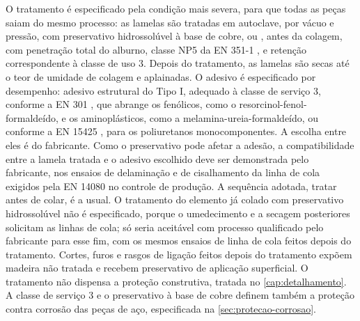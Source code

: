 O tratamento é especificado pela condição mais severa, para que todas as peças
saiam do mesmo processo: as lamelas são tratadas em autoclave, por vácuo e
pressão, com preservativo hidrossolúvel à base de cobre,  ou
, antes da
colagem, com penetração total do alburno, classe NP5 da EN 351-1
\cite{EN351-1:2007}, e retenção correspondente à classe de uso 3. Depois do
tratamento, as lamelas são secas até o teor de umidade de colagem e
aplainadas. O adesivo é especificado por desempenho: adesivo estrutural do
Tipo I, adequado à classe de serviço 3, conforme a EN 301 \cite{EN301:2017}, que
abrange os fenólicos, como o resorcinol-fenol-formaldeído, e os aminoplásticos,
como a melamina-ureia-formaldeído, ou conforme a EN 15425 \cite{EN15425:2017},
para os poliuretanos monocomponentes. A escolha entre eles é do fabricante. Como
o preservativo pode afetar a adesão, a compatibilidade entre a lamela tratada e o
adesivo escolhido deve ser demonstrada pelo fabricante, nos ensaios de
delaminação e de cisalhamento da linha de cola exigidos pela EN 14080
\cite{EN14080:2013} no controle de produção. A sequência adotada, tratar antes de
colar, é a usual. O tratamento do elemento já colado com preservativo
hidrossolúvel não é especificado, porque o umedecimento e a secagem posteriores
solicitam as linhas de cola; só seria aceitável com processo qualificado pelo
fabricante para esse fim, com os mesmos ensaios de linha de cola feitos depois
do tratamento. Cortes, furos e rasgos de ligação
feitos depois do tratamento expõem madeira não tratada e recebem preservativo
de aplicação superficial. O tratamento não dispensa a proteção construtiva,
tratada no \autoref{cap:detalhamento}. A classe de serviço 3 e o preservativo à
base de cobre definem também a proteção contra corrosão das peças de aço,
especificada na \autoref{sec:protecao-corrosao}.

